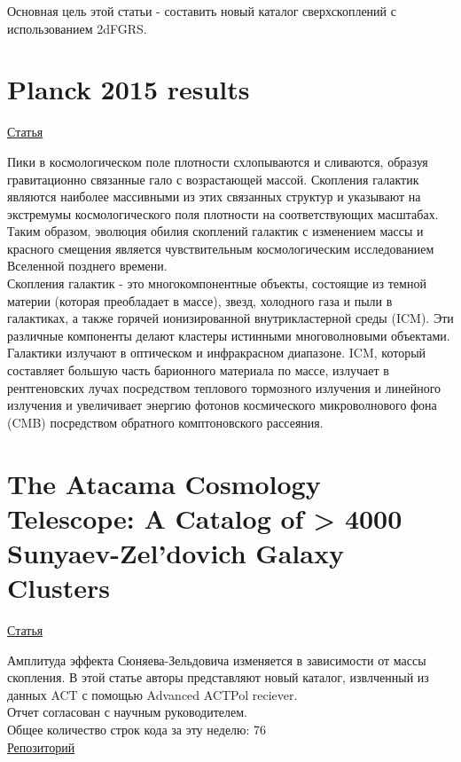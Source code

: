 \documentclass{article}
\begin{document}
Основная цель этой статьи - составить новый каталог сверхскоплений с использованием 2dFGRS.\\

\section{Planck 2015 results}
\hyperlink{https://www.aanda.org/articles/aa/pdf/2016/10/aa25823-15.pdf}{Статья}

Пики в космологическом поле плотности схлопываются и сливаются, образуя гравитационно связанные 
гало с возрастающей массой. Скопления галактик являются наиболее массивными из этих связанных 
структур и указывают на экстремумы космологического поля плотности на соответствующих масштабах.
Таким образом, эволюция обилия скоплений галактик с изменением массы и красного смещения является
чувствительным космологическим исследованием Вселенной позднего времени.\\

Скопления галактик - это многокомпонентные объекты, состоящие из темной материи (которая 
преобладает в массе), звезд, холодного газа и пыли в галактиках, а также горячей ионизированной
внутрикластерной среды (ICM). Эти различные компоненты делают кластеры истинными многоволновыми 
объектами. Галактики излучают в оптическом и инфракрасном диапазоне. ICM, который составляет 
большую часть барионного материала по массе, излучает в рентгеновских лучах посредством теплового
тормозного излучения и линейного излучения и увеличивает энергию фотонов космического микроволнового 
фона (CMB) посредством обратного комптоновского рассеяния.\\

\section{The Atacama Cosmology Telescope: A Catalog of > 4000 Sunyaev-Zel’dovich Galaxy Clusters}
\hyperlink{https://arxiv.org/pdf/2009.11043.pdf}{Статья}

Амплитуда эффекта Сюняева-Зельдовича изменяется в зависимости от массы скопления. В этой статье 
авторы представляют новый каталог, извлченный из данных ACT с помощью Advanced ACTPol reciever.\\

Отчет согласован с научным руководителем.\\
Общее количество строк кода за эту неделю: 76\\
\hyperlink{https://github.com/rt2122/data-segmentation-2}{Репозиторий}\\ 
\end{document}
